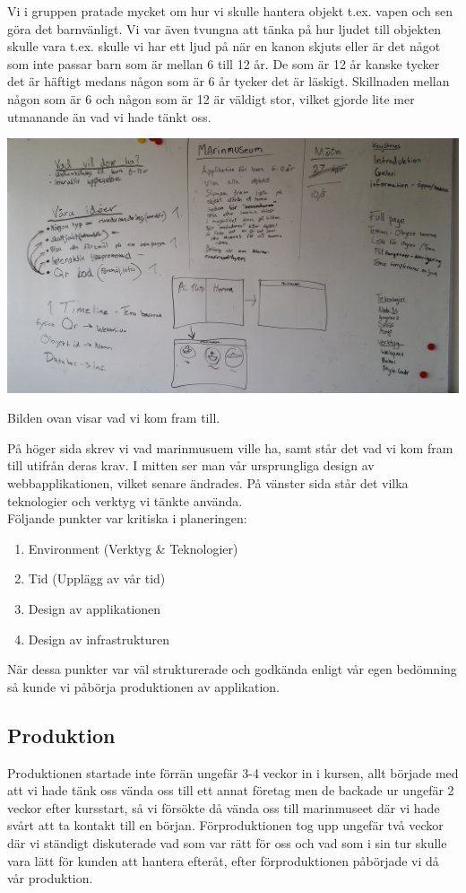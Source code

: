 \documentclass[12pt, titlepage]{article}
\begin{document}
Vi i gruppen pratade mycket om hur vi skulle hantera objekt t.ex. vapen och sen göra det barnvänligt. 
Vi var även tvungna att tänka på hur ljudet till objekten skulle vara t.ex. skulle vi har 
ett ljud på när en kanon skjuts eller är det något som inte passar barn som är mellan 6 till 12 år. 
De som är 12 år kanske tycker det är häftigt medans någon som är 6 år tycker det är läskigt. 
Skillnaden mellan någon som är 6 och någon som är 12 är väldigt stor, vilket gjorde lite mer utmanande än vad vi hade tänkt oss.
\begin{center}
  \includegraphics[width=1.0\textwidth]{tavla}
\end{center}
\begin{center}
Bilden ovan visar vad vi kom fram till. 
\end{center}
\newpage
På höger sida skrev vi vad marinmusuem ville ha, samt står det vad vi kom 
fram till utifrån deras krav. I mitten ser man vår ursprungliga design av webbapplikationen, vilket senare ändrades. 
På vänster sida står det vilka teknologier och verktyg vi tänkte använda. 
\\
Följande punkter var kritiska i planeringen:
\begin{enumerate}
  \item Environment (Verktyg \& Teknologier)
  \item Tid (Upplägg av vår tid)
  \item Design av applikationen
  \item Design av infrastrukturen
\end{enumerate}
När dessa punkter var väl strukturerade och godkända enligt vår egen bedömning så kunde vi påbörja produktionen av applikation.

\subsection{Produktion}
Produktionen startade inte förrän ungefär 3-4 veckor in i kursen, allt började med att vi hade tänk oss
vända oss till ett annat företag men de backade ur ungefär 2 veckor efter kursstart, 
så vi försökte då vända oss till marinmuseet där vi hade svårt att ta kontakt till en början.	
Förproduktionen tog upp ungefär två veckor där vi ständigt diskuterade vad som var rätt för oss och vad som i
sin tur skulle vara lätt för kunden att hantera efteråt, efter förproduktionen påbörjade vi då vår produktion. 
\end{document}
